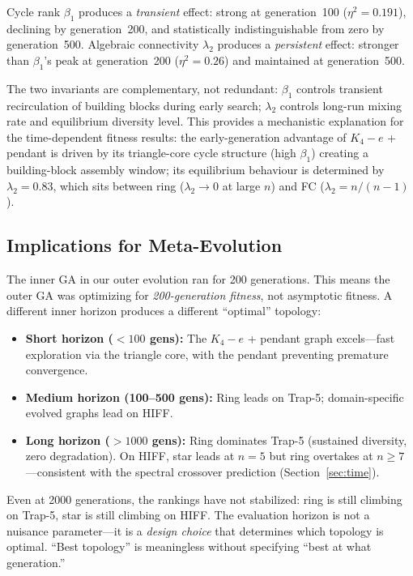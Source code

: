 \documentclass[sigconf,nonacm]{acmart}
\begin{document}
Cycle rank $\beta_1$ produces a \emph{transient} effect: strong at
generation~100 ($\eta^2 = 0.191$), declining by generation~200, and
statistically indistinguishable from zero by generation~500. Algebraic
connectivity $\lambda_2$ produces a \emph{persistent} effect: stronger
than $\beta_1$'s peak at generation~200 ($\eta^2 = 0.26$) and
maintained at generation~500.

The two invariants are complementary, not redundant: $\beta_1$ controls
transient recirculation of building blocks during early search;
$\lambda_2$ controls long-run mixing rate and equilibrium diversity
level. This provides a mechanistic explanation for the time-dependent
fitness results: the early-generation advantage of $K_4 - e$ + pendant
is driven by its triangle-core cycle structure (high $\beta_1$) creating
a building-block assembly window; its equilibrium behaviour is
determined by $\lambda_2 = 0.83$, which sits between ring ($\lambda_2
\to 0$ at large $n$) and FC ($\lambda_2 = n/(n-1)$).

\subsection{Implications for Meta-Evolution}

The inner GA in our outer evolution ran for 200 generations. This means
the outer GA was optimizing for \emph{200-generation fitness}, not
asymptotic fitness. A different inner horizon produces a different
``optimal'' topology:

\begin{itemize}
\item \textbf{Short horizon ($< 100$ gens):} The $K_4{-}e$ + pendant
  graph excels---fast exploration via the triangle core, with the
  pendant preventing premature convergence.
\item \textbf{Medium horizon (100--500 gens):} Ring leads on Trap-5;
  domain-specific evolved graphs lead on HIFF.
\item \textbf{Long horizon ($> 1000$ gens):} Ring dominates Trap-5
  (sustained diversity, zero degradation). On HIFF, star leads at
  $n=5$ but ring overtakes at $n \geq 7$---consistent with the
  spectral crossover prediction (Section~\ref{sec:time}).
\end{itemize}

Even at 2000 generations, the rankings have not stabilized: ring is
still climbing on Trap-5, star is still climbing on HIFF. The
evaluation horizon is not a nuisance parameter---it is a
\emph{design choice} that determines which topology is optimal.
``Best topology'' is meaningless without specifying ``best at what
generation.''
\end{document}

